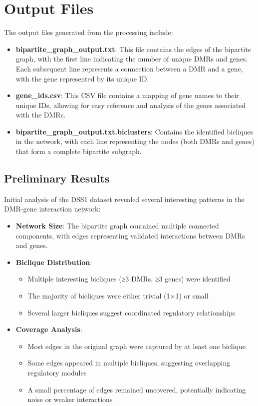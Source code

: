 \documentclass{article}
\begin{document}
\section{Output Files}
The output files generated from the processing include:

\begin{itemize}
    \item \textbf{bipartite_graph_output.txt}: This file contains the edges of the bipartite graph, with the first line indicating the number of unique DMRs and genes. Each subsequent line represents a connection between a DMR and a gene, with the gene represented by its unique ID.
    \item \textbf{gene_ids.csv}: This CSV file contains a mapping of gene names to their unique IDs, allowing for easy reference and analysis of the genes associated with the DMRs.
    \item \textbf{bipartite_graph_output.txt.biclusters}: Contains the identified bicliques in the network, with each line representing the nodes (both DMRs and genes) that form a complete bipartite subgraph.
\end{itemize}

\subsection{Preliminary Results}
Initial analysis of the DSS1 dataset revealed several interesting patterns in the DMR-gene interaction network:

\begin{itemize}
    \item \textbf{Network Size}: The bipartite graph contained multiple connected components, with edges representing validated interactions between DMRs and genes.
    
    \item \textbf{Biclique Distribution}:
    \begin{itemize}
        \item Multiple interesting bicliques (≥3 DMRs, ≥3 genes) were identified
        \item The majority of bicliques were either trivial (1×1) or small
        \item Several larger bicliques suggest coordinated regulatory relationships
    \end{itemize}
    
    \item \textbf{Coverage Analysis}:
    \begin{itemize}
        \item Most edges in the original graph were captured by at least one biclique
        \item Some edges appeared in multiple bicliques, suggesting overlapping regulatory modules
        \item A small percentage of edges remained uncovered, potentially indicating noise or weaker interactions
    \end{itemize}
\end{itemize}
\end{document}
